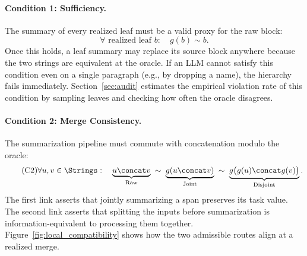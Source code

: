 \paragraph{Condition 1: Sufficiency.}
The summary of every realized leaf must be a valid proxy for the raw block:
\begin{equation}\tag{C1}\label{eq:leaf_sufficiency}
\forall \text{ realized leaf } b:\quad g(b) \sim b.
\end{equation}
Once this holds, a leaf summary may replace its source block anywhere because the two strings are equivalent at the oracle. If an LLM cannot satisfy this condition even on a single paragraph (e.g., by dropping a name), the hierarchy fails immediately. Section~\ref{sec:audit} estimates the empirical violation rate of this condition by sampling leaves and checking how often the oracle disagrees.

\paragraph{Condition 2: Merge Consistency.}
The summarization pipeline must commute with concatenation modulo the oracle:
\begin{equation}\tag{C2}\label{eq:leaf_compatibility}
\forall u, v \in \Strings:\quad
\underbrace{u \concat v}_{\text{Raw}} \;\sim\;
\underbrace{g(u \concat v)}_{\text{Joint}} \;\sim\;
\underbrace{g\big(g(u) \concat g(v)\big)}_{\text{Disjoint}}.
\end{equation}
The first link asserts that jointly summarizing a span preserves its task value. The second link asserts that splitting the inputs before summarization is information-equivalent to processing them together. Figure~\ref{fig:local_compatibility} shows how the two admissible routes align at a realized merge.

